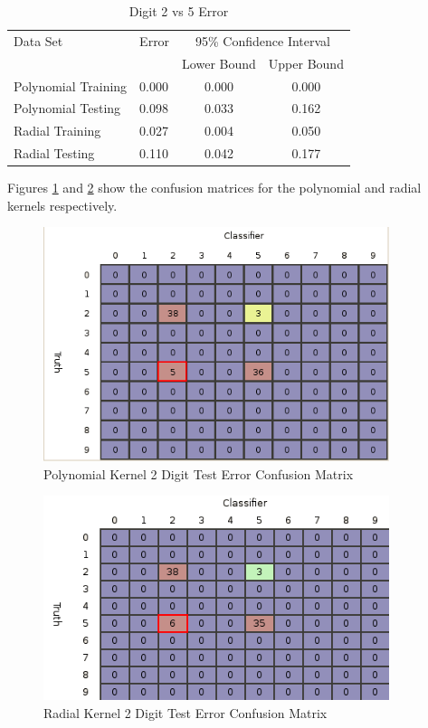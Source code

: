 \documentclass{article}
\begin{document}
\begin{table}
\caption{Digit 2 vs 5 Error}
\begin{center}
\begin{tabular}{llcc}
\toprule
Data Set & Error & \multicolumn{2}{c}{95\% Confidence Interval} \\
\cmidrule(r){3-4}
& & Lower Bound & Upper Bound \\
\midrule
Polynomial Training & 0.000 & 0.000 & 0.000 \\
Polynomial Testing & 0.098 & 0.033 & 0.162 \\
Radial Training & 0.027 & 0.004 & 0.050 \\
Radial Testing & 0.110 & 0.042 & 0.177 \\
\bottomrule
\end{tabular}
\label{error1}
\end{center}
\end{table}

Figures \ref{poly2testconfusion} and \ref{radial2testconfusion} show the confusion matrices for the polynomial and radial kernels respectively.

\begin{figure}
\centering
\includegraphics[width=0.9\textwidth]{images/test2_5_confusion_a0156.png}
\caption{Polynomial Kernel 2 Digit Test Error Confusion Matrix}
\label{poly2testconfusion}
\end{figure}

\begin{figure}
\centering
\includegraphics[width=0.9\textwidth]{images/test2_5_confusion_radial.png}
\caption{Radial Kernel 2 Digit Test Error Confusion Matrix}
\label{radial2testconfusion}
\end{figure}
\end{document}
